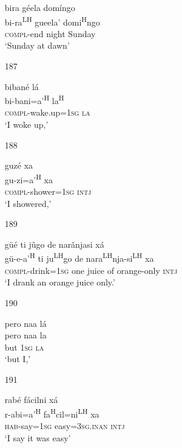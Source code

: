 \begin{itemize}
\glll  bira g\'{e}ela dom\'{i}ngo\\
 bi-ra\textsuperscript{LH} gueela' domi\textsuperscript{H}ngo \\
\textsc{compl}-end night Sunday\\
\glt `Sunday at dawn'
 


\item[187]
 
\glll biban\'{e} l\'{a}\\
bi-bani=a'\textsuperscript{H} la\textsuperscript{H}\\
\textsc{compl}-wake.up=\textsc{1sg} \textsc{la}\\
\glt `I woke up,' 



\item [188]

\glll guz\'{e} xa\\
gu-zi=a'\textsuperscript{H} xa\\
\textsc{compl}-shower=\textsc{1sg} \textsc{intj}\\
\glt `I showered,' 


\item [189]

\glll g\"{u}\'{e} ti j\v{u}go de nar\v{a}njasi x\'{a}\\
g\"{u}-e-a'\textsuperscript{H} ti ju\textsuperscript{LH}go de nara\textsuperscript{LH}nja-si\textsuperscript{LH} xa\\
\textsc{compl}-drink=\textsc{1sg} one juice of orange-only \textsc{intj}\\
\glt `I drank an orange juice only.'



\item[190]
 
\glll   pero naa l\'{a} \\
 pero naa la\\
 but \textsc{1sg} \textsc{la}\\
\glt `but I,'
 


\item[191]
 
\glll   rab\'{e} f\'{a}cilni x\'{a} \\
 r-abi=a'\textsuperscript{H} fa\textsuperscript{H}cil=ni\textsuperscript{LH} xa\\
\textsc{hab}-say=\textsc{1sg} easy=\textsc{3sg.inan} \textsc{intj}\\
\glt `I say it was easy'
 



\end{itemize}
